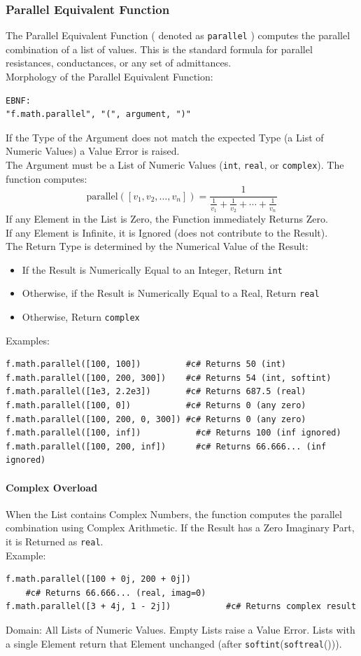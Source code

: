 \subsubsection{Parallel Equivalent Function}
The Parallel Equivalent Function ( denoted as \texttt{parallel} ) computes the parallel combination of a list of values. This is the standard formula for parallel resistances, conductances, or any set of admittances. \\
Morphology of the Parallel Equivalent Function:
\begin{verbatim}
EBNF:
"f.math.parallel", "(", argument, ")"
\end{verbatim}
If the Type of the Argument does not match the expected Type (a List of Numeric Values) a Value Error is raised.\\
The Argument must be a List of Numeric Values (\texttt{int}, \texttt{real}, or \texttt{complex}). The function computes:
\[
\text{parallel}([v_1, v_2, \ldots, v_n]) = \frac{1}{\frac{1}{v_1} + \frac{1}{v_2} + \cdots + \frac{1}{v_n}}
\]
If any Element in the List is Zero, the Function immediately Returns Zero.\\
If any Element is Infinite, it is Ignored (does not contribute to the Result).\\
The Return Type is determined by the Numerical Value of the Result:
\begin{itemize}
\item If the Result is Numerically Equal to an Integer, Return \texttt{int}
\item Otherwise, if the Result is Numerically Equal to a Real, Return \texttt{real}
\item Otherwise, Return \texttt{complex}
\end{itemize}
Examples:
\begin{verbatim}
f.math.parallel([100, 100])         #c# Returns 50 (int)
f.math.parallel([100, 200, 300])    #c# Returns 54 (int, softint)
f.math.parallel([1e3, 2.2e3])       #c# Returns 687.5 (real)
f.math.parallel([100, 0])           #c# Returns 0 (any zero)
f.math.parallel([100, 200, 0, 300]) #c# Returns 0 (any zero)
f.math.parallel([100, inf])           #c# Returns 100 (inf ignored)
f.math.parallel([100, 200, inf])      #c# Returns 66.666... (inf ignored)
\end{verbatim}

\paragraph{Complex Overload}
When the List contains Complex Numbers, the function computes the parallel combination using Complex Arithmetic. If the Result has a Zero Imaginary Part, it is Returned as \texttt{real}. \\
Example:
\begin{verbatim}
f.math.parallel([100 + 0j, 200 + 0j])
    #c# Returns 66.666... (real, imag=0)
f.math.parallel([3 + 4j, 1 - 2j])           #c# Returns complex result
\end{verbatim}
Domain: All Lists of Numeric Values. Empty Lists raise a Value Error. Lists with a single Element return that Element unchanged (after \texttt{softint}(\texttt{softreal}())).\\


